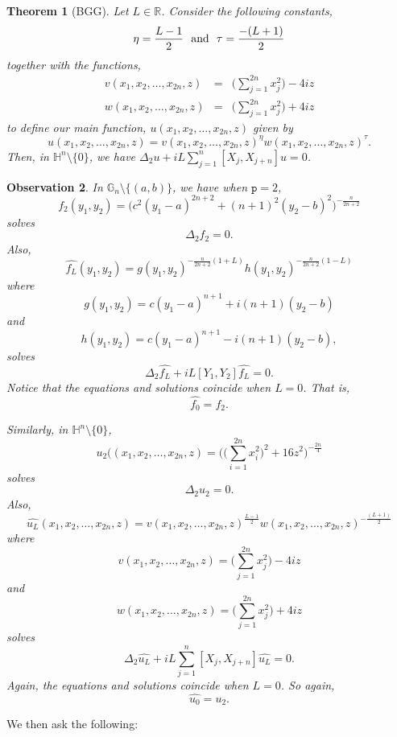 \documentclass[12pt]{amsart}
\theoremstyle{plain}
\newtheorem{theorem}{Theorem}[section]
\newtheorem{obs}[theorem]{Observation}
\theoremstyle{definition}
\numberwithin{equation}{section}
\begin{document}
\begin{theorem}[BGG]\label{MH}
Let $L \in \mathbb{R}$. Consider the following constants,
\begin{equation*}
\eta = \frac{L-1}{2} \ \ \textmd{and}\ \ \tau  =  \frac{-(L+1)}{2} 
\end{equation*}
together with the functions,
\begin{eqnarray*}
v(x_1,x_2,\ldots, x_{2n},z) & = & \big(\sum_{j=1}^{2n} x_j^2\big) - 4 i z \\
w(x_1,x_2,\ldots, x_{2n},z) & = & \big(\sum_{j=1}^{2n}x_j^2\big) + 4 i z
\end{eqnarray*}
to define our main function, $u(x_1,x_2,\ldots, x_{2n},z)$ given by
$$u(x_1,x_2,\ldots, x_{2n},z)= v(x_1,x_2,\ldots, x_{2n},z)^\eta w(x_1,x_2,\ldots, x_{2n},z)^\tau.$$ 
Then, in $\mathbb{H}^n\setminus\{0\}$, we have $\Delta_{2}u+iL\sum_{j=1}^{n}[X_j,X_{j+n}]u=0$.
\end{theorem}
\begin{obs}
In $\mathbb{G}_n\setminus\{(a,b)\}$, we have when ${\texttt{p}}=2$, $$f_2(y_1,y_2)=\big(c^2(y_1-a)^{2n+2}+(n+1)^2(y_2-b)^2\big)^{\displaystyle{-\frac{n}{2n+2}}}$$ solves $$\Delta_2f_2=0.$$
Also, $$\widehat{f_L}(y_1,y_2)=g(y_1,y_2)^{-\frac{n}{2n+2}(1+L)}h(y_1,y_2)^{-\frac{n}{2n+2}(1-L)}$$ where $$g(y_1,y_2)=c(y_1-a)^{n+1}+i(n+1)(y_2-b)$$ and $$h(y_1,y_2)=c(y_1-a)^{n+1}-i(n+1)(y_2-b),$$
solves $$\Delta_2\widehat{f_L}+iL[Y_1,Y_2]\widehat{f_L}=0.$$
Notice that the equations and solutions coincide when $L=0$. That is, $$\widehat{f_0}=f_2.$$ 

Similarly, in $\mathbb{H}^n\setminus\{0\}$, $$u_2((x_1,x_2,\ldots, x_{2n},z)= \Big(\big(\sum_{i=1}^{2n}x_i^2\big)^2+16z^2\Big)^{-\frac{2n}{4}}$$ solves $$\Delta_2u_2=0.$$
Also, $$\widehat{u_L}(x_1,x_2,\ldots, x_{2n},z)=v(x_1,x_2,\ldots, x_{2n},z)^{\frac{L-1}{2}}w(x_1,x_2,\ldots, x_{2n},z)^{-\frac{(L+1)}{2}}$$ where $$v(x_1,x_2,\ldots, x_{2n},z)=\big(\sum_{j=1}^{2n}x_j^2\big)-4iz$$ and $$w(x_1,x_2,\ldots, x_{2n},z)=\big(\sum_{j=1}^{2n}x_j^2\big)+4iz$$ solves $$\Delta_2\widehat{u_L}+iL\sum_{j=1}^n[X_j,X_{j+n}]\widehat{u_L}=0.$$
Again, the equations and solutions coincide when $L=0$. So again, $$\widehat{u_0}=u_2.$$
\end{obs}
We then ask the following:
\end{document}
